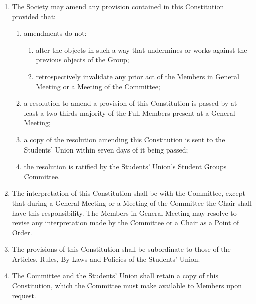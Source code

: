 \documentclass[12pt]{constitution}
\begin{document}
\begin{enumerate}
    \item The Society may amend any provision contained in this Constitution provided that:
    \begin{enumerate}
        \item amendments do not:
        \begin{enumerate}
            \item alter the objects in such a way that undermines or works against the previous objects of the Group;
            \item retrospectively invalidate any prior act of the Members in General Meeting or a Meeting of the Committee;
        \end{enumerate}

        \item a resolution to amend a provision of this Constitution is passed by at least a two-thirds majority of the Full Members present at a General Meeting;
        \item a copy of the resolution amending this Constitution is sent to the Students' Union within seven days of it being passed;
        \item the resolution is ratified by the Students' Union's Student Groups Committee.
    \end{enumerate}

    \item The interpretation of this Constitution shall be with the Committee, except that during a General Meeting or a Meeting of the Committee the Chair shall have this responsibility.  The Members in General Meeting may resolve to revise any interpretation made by the Committee or a Chair as a Point of Order.
    \item The provisions of this Constitution shall be subordinate to those of the Articles, Rules, By-Laws and Policies of the Students' Union.
    \item The Committee and the Students' Union shall retain a copy of this Constitution, which the Committee must make available to Members upon request.
\end{enumerate}


\label{article:dissolution}
\end{document}
